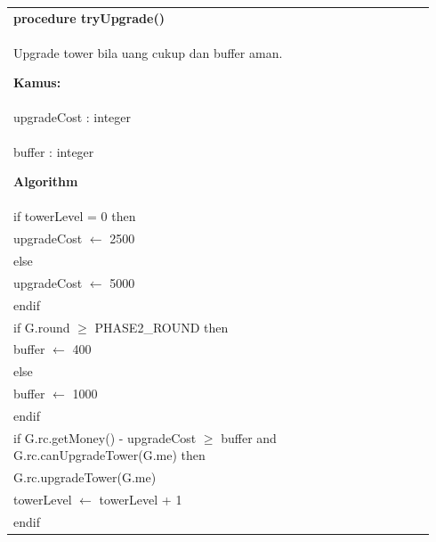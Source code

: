 \documentclass{article}
\newenvironment{pseudobox}
{
\centering
\begin{longtable}{|p{0.94\linewidth}|}
\hline
}
{
\\ \hline
\end{longtable}
\vspace{0.05cm}
}
\begin{document}
\begin{pseudobox}
\textbf{procedure tryUpgrade()} \\
{ Upgrade tower bila uang cukup dan buffer aman. }

\textbf{Kamus:} \\
\hspace*{1em} upgradeCost : integer \\
\hspace*{1em} buffer : integer

\textbf{Algorithm} \\
\hspace*{1em} if towerLevel = 0 then \\
\hspace*{2em} upgradeCost $\leftarrow$ 2500 \\
\hspace*{1em} else \\
\hspace*{2em} upgradeCost $\leftarrow$ 5000 \\
\hspace*{1em} endif \\

\hspace*{1em} if G.round $\geq$ PHASE2\_ROUND then \\
\hspace*{2em} buffer $\leftarrow$ 400 \\
\hspace*{1em} else \\
\hspace*{2em} buffer $\leftarrow$ 1000 \\
\hspace*{1em} endif \\

\hspace*{1em} if G.rc.getMoney() - upgradeCost $\geq$ buffer and G.rc.canUpgradeTower(G.me) then \\
\hspace*{2em} G.rc.upgradeTower(G.me) \\
\hspace*{2em} towerLevel $\leftarrow$ towerLevel + 1 \\
\hspace*{1em} endif
\end{pseudobox}
\end{document}
